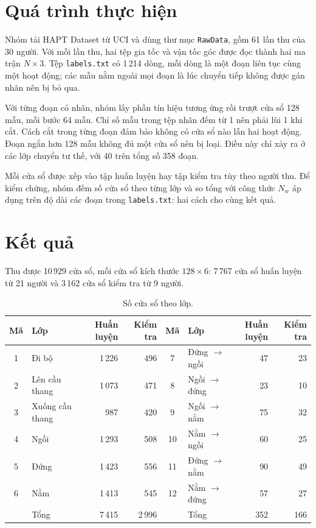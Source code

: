 \documentclass[12pt,a4paper]{article}
\begin{document}
\section{Quá trình thực hiện}
Nhóm tải HAPT Dataset từ UCI và dùng thư mục \texttt{RawData}, gồm 61 lần thu của 30 người. Với mỗi lần thu, hai tệp gia tốc và vận tốc góc được đọc thành hai ma trận $N \times 3$. Tệp \texttt{labels.txt} có 1\,214 dòng, mỗi dòng là một đoạn liên tục cùng một hoạt động; các mẫu nằm ngoài mọi đoạn là lúc chuyển tiếp không được gán nhãn nên bị bỏ qua.

Với từng đoạn có nhãn, nhóm lấy phần tín hiệu tương ứng rồi trượt cửa sổ 128 mẫu, mỗi bước 64 mẫu. Chỉ số mẫu trong tệp nhãn đếm từ 1 nên phải lùi 1 khi cắt. Cách cắt trong từng đoạn đảm bảo không có cửa sổ nào lẫn hai hoạt động. Đoạn ngắn hơn 128 mẫu không đủ một cửa sổ nên bị loại. Điều này chỉ xảy ra ở các lớp chuyển tư thế, với 40 trên tổng số 358 đoạn.

Mỗi cửa sổ được xếp vào tập huấn luyện hay tập kiểm tra tùy theo người thu. Để kiểm chứng, nhóm đếm số cửa sổ theo từng lớp và so tổng với công thức $N_w$ áp dụng trên độ dài các đoạn trong \texttt{labels.txt}: hai cách cho cùng kết quả.

\section{Kết quả}
Thu được 10\,929 cửa sổ, mỗi cửa sổ kích thước $128 \times 6$: 7\,767 cửa sổ huấn luyện từ 21 người và 3\,162 cửa sổ kiểm tra từ 9 người.

\begin{table}[H]
\centering
\small
\begin{tabular}{@{}clrr@{\hspace{0.8cm}}clrr@{}}
\toprule
\textbf{Mã} & \textbf{Lớp} & \textbf{Huấn luyện} & \textbf{Kiểm tra} &
\textbf{Mã} & \textbf{Lớp} & \textbf{Huấn luyện} & \textbf{Kiểm tra} \\
\midrule
1 & Đi bộ           & 1\,226 & 496 & 7  & Đứng $\to$ ngồi & 47 & 23 \\
2 & Lên cầu thang   & 1\,073 & 471 & 8  & Ngồi $\to$ đứng & 23 & 10 \\
3 & Xuống cầu thang & 987    & 420 & 9  & Ngồi $\to$ nằm  & 75 & 32 \\
4 & Ngồi            & 1\,293 & 508 & 10 & Nằm $\to$ ngồi  & 60 & 25 \\
5 & Đứng            & 1\,423 & 556 & 11 & Đứng $\to$ nằm  & 90 & 49 \\
6 & Nằm             & 1\,413 & 545 & 12 & Nằm $\to$ đứng  & 57 & 27 \\
\midrule
  & Tổng            & 7\,415 & 2\,996 &  & Tổng          & 352 & 166 \\
\bottomrule
\end{tabular}
\caption{Số cửa sổ theo lớp.}
\end{table}
\end{document}

